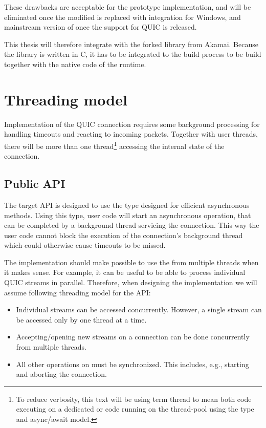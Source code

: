 These drawbacks are acceptable for the prototype implementation, and will be eliminated once the
modified \libopenssl{} is replaced with \libschannel{} integration for Windows, and mainstream
version of \libopenssl{} once the support for QUIC is released.

This thesis will therefore integrate with the forked \libopenssl{} library from Akamai. Because the
library is written in C, it has to be integrated to the build process to be build together with the
native code of the \dotnet{} runtime.

\section{Threading model}

Implementation of the QUIC connection requires some background processing for handling timeouts and
reacting to incoming packets. Together with user threads, there will be more than one
thread\footnote{To reduce verbosity, this text will be using term thread to mean both code executing on a
  dedicated  or code running on the thread-pool using the  type and
  \dotnet{} async/await model.} accessing the internal state of the connection.

\subsection{Public API}

The target API is designed to use the  type designed for efficient asynchronous
methods. Using this type, user code will start an asynchronous operation, that can be completed by a
background thread servicing the connection. This way the user code cannot block the execution of the
connection's background thread which could otherwise cause timeouts to be missed.

The implementation should make possible to use the \QuicConnection{} from multiple threads when
it makes sense. For example, it can be useful to be able to process individual QUIC streams in
parallel. Therefore, when designing the implementation we will assume following threading model for
the API:

\begin{itemize}

  \item Individual streams can be accessed concurrently. However, a single stream can be
    accessed only by one thread at a time.

  \item Accepting/opening new streams on a connection can be done concurrently from multiple threads.

  \item All other operations on \QuicConnection{} must be synchronized. This includes, e.g.,
    starting and aborting the connection.

\end{itemize}

